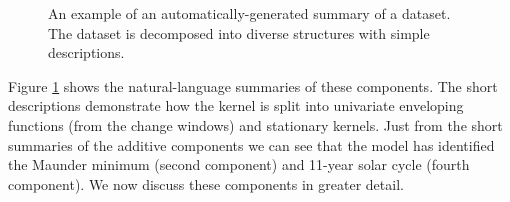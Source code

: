 \documentclass{article}
\begin{document}
\begin{figure}[h]
\centering
{}
\caption{
An example of an automatically-generated summary of a dataset.  The dataset is decomposed into diverse structures with simple descriptions.}
\label{fig:exec}
\end{figure}
Figure \ref{fig:exec} shows the natural-language summaries of these components.
The short descriptions demonstrate how the kernel is split into univariate enveloping functions (from the change windows) and stationary kernels.
%
%
Just from the short summaries of the additive components we can see that the model has identified the Maunder minimum (second component) and 11-year solar cycle (fourth component).
We now discuss these components in greater detail.
\end{document}
